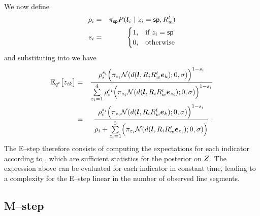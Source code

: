 We now define
\begin{eqnarray}
  \SpurJoint_i &=& 
  \Mixing_{\Spurious}
  P(\LineSeg_i ~|~ \Indicator_i=\Spurious,\SceneR^t) \\
  \SpurIndicator_i &=&
  \begin{cases}
    1, & \mbox{if } \Indicator_i = \Spurious \\
    0, & \mbox{otherwise}
  \end{cases}
\end{eqnarray}
and substituting into  we have
\begin{eqnarray}
  \Expected_{\PosteriorEst^t}\bigl[ \Indicator_{ik} \bigr]
  &=&
  \frac{
    \SpurJoint_i^{\SpurIndicator_i}
    \Bigl(
    \Mixing_{\Indicator_i}
    \NormalDistr(\dist(\LineSeg,\CamR_i\SceneR^t\ebasis_k); 0, \sigma)
    \Bigr)^{1-\SpurIndicator_i}
  }{
    \sum_{\Indicator_i=1}^4\limits
    \SpurJoint_i^{\SpurIndicator_i}
    \Bigl(
    \Mixing_{\Indicator_i}
    \NormalDistr(\dist(\LineSeg,\CamR_i\SceneR^t\ebasis_{\Indicator_i}); 0, \sigma)
    \Bigr)^{1-\SpurIndicator_i}
  }\\
  &=&
  \frac{
    \SpurJoint_i^{\SpurIndicator_i}
    \Bigl(
    \Mixing_{\Indicator_i}
    \NormalDistr(\dist(\LineSeg,\CamR_i\SceneR^t\ebasis_k); 0, \sigma)
    \Bigr)^{1-\SpurIndicator_i}
  }{
    \SpurJoint_i +
    \sum_{\Indicator_i=1}^3\limits
    \Bigl(
    \Mixing_{\Indicator_i}
    \NormalDistr(\dist(\LineSeg,\CamR_i\SceneR^t\ebasis_{\Indicator_i}); 0, \sigma)
    \Bigr)
  }~.
  \label{eq:final-estep}
\end{eqnarray}
The E--step therefore consists of computing the expectations for
each indicator according to , which are sufficient
statistics for the posterior on $\Indicators$. The expression
above can be evaluated for each indicator in constant time, leading to
a complexity for the E--step linear in the number of observed line
segments.

\subsection{M--step}
\label{sect:mstep}

